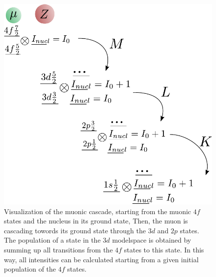 %
\begin{figure}%
\centering
\includegraphics[width=0.62\linewidth]{pics/cascade.pdf}%
\caption{Visualization of the muonic cascade, starting from the muonic $4f$ states and the nucleus in its ground state, Then, the muon is cascading towords its ground state through the $3d$ and $2p$ states. The population of a state in the $3d$ modelspace is obtained by summing up all transitions from the $4f$ states to this state. In this way, all intensities can be calculated starting from a given initial population of the $4f$ states.}%
\label{fig:cascade}%
\end{figure}
%
\newpage
